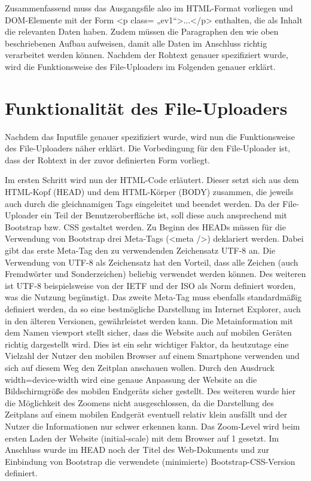 {Zusammenfassend muss das Ausgangsfile also im HTML-Format vorliegen und DOM-Elemente mit der Form <p class= „ev1“>...</p> enthalten, die als Inhalt die relevanten Daten haben. Zudem müssen die Paragraphen den wie oben beschriebenen Aufbau aufweisen, damit alle Daten im Anschluss richtig verarbeitet werden können. 
Nachdem der Rohtext genauer spezifiziert wurde, wird die Funktionsweise des File-Uploaders im Folgenden genauer erklärt.

\section{Funktionalität des File-Uploaders}
Nachdem das Inputfile genauer spezifiziert wurde, wird nun die Funktionsweise des File-Uploaders näher erklärt. Die Vorbedingung für den File-Uploader ist, dass der Rohtext in der zuvor definierten Form vorliegt.

Im ersten Schritt wird nun der HTML-Code erläutert. Dieser setzt sich aus dem HTML-Kopf (HEAD) und dem HTML-Körper (BODY) zusammen, die jeweils auch durch die gleichnamigen Tags eingeleitet und beendet werden. Da der File-Uploader ein Teil der Benutzeroberfläche ist, soll diese auch ansprechend mit Bootstrap bzw. CSS gestaltet werden. Zu Beginn des HEADs müssen für die Verwendung von Bootstrap drei Meta-Tags (<meta />) deklariert werden. 
Dabei gibt das erste Meta-Tag den zu verwendenden Zeichensatz \ac{UTF-8} an. Die Verwendung von UTF-8 als Zeichensatz hat den Vorteil, dass alle Zeichen (auch Fremdwörter und Sonderzeichen) beliebig verwendet werden können. Des weiteren ist UTF-8 beispielsweise von der \ac{IETF} und der \ac{ISO} als Norm definiert worden, was die Nutzung begünstigt. 
Das zweite Meta-Tag muss ebenfalls standardmäßig definiert werden, da so eine bestmögliche Darstellung im Internet Explorer, auch in den älteren Versionen, gewährleistet werden kann. 
Die Metainformation mit dem Namen viewport stellt sicher, dass die Website auch auf mobilen Geräten richtig dargestellt wird. Dies ist ein sehr wichtiger Faktor, da heutzutage eine Vielzahl der Nutzer den mobilen Browser auf einem Smartphone verwenden und sich auf diesem Weg den Zeitplan anschauen wollen. Durch den Ausdruck width=device-width wird eine genaue Anpassung der Website an die Bildschirmgröße des mobilen Endgeräts sicher gestellt. Des weiteren wurde hier die Möglichkeit des Zoomens nicht ausgeschlossen, da die Darstellung des Zeitplans auf einem mobilen Endgerät eventuell relativ klein ausfällt und der Nutzer die Informationen nur schwer erkennen kann. Das Zoom-Level wird beim ersten Laden der Website (initial-scale) mit dem Browser auf 1 gesetzt. 
Im Anschluss wurde im HEAD noch der Titel des Web-Dokuments und zur Einbindung von Bootstrap die verwendete (minimierte) Bootstrap-CSS-Version definiert. 

}
